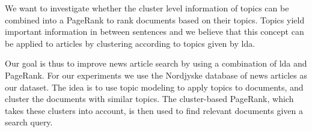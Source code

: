 We want to investigate whether the cluster level information of topics can be combined into a PageRank to rank documents based on their topics.
Topics yield important information in \cite{ClusterPageRank} between sentences and we believe that this concept can be applied to articles by clustering according to topics given by \gls{lda}.

Our goal is thus to improve news article search by using a combination of \gls{lda} and PageRank.
For our experiments we use the Nordjyske database of news articles as our dataset.
The idea is to use topic modeling to apply topics to documents, and cluster the documents with similar topics.
The cluster-based PageRank, which takes these clusters into account, is then used to find relevant documents given a search query.




